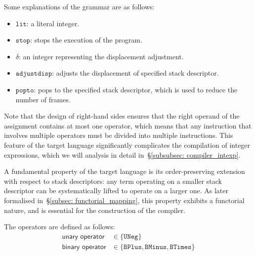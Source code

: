 \documentclass[12pt,a4paper]{report}
\theoremstyle{definition}
\newcommand{\secref}[1]{\S\ref{#1}}
\begin{document}
    Some explanations of the grammar are as follows:
    \begin{itemize}
        \item 
            $\texttt{lit}$: a literal integer.
        \item 
            $\texttt{stop}$: stops the execution of the program.
        \item 
            $\delta$: an integer representing the displacement adjustment.
        \item 
            $\texttt{adjustdisp}$: adjusts the displacement of specified stack descriptor.
        \item 
            $\texttt{popto}$: pops to the specified stack descriptor, which is used to reduce the number of frames.
    \end{itemize}
    Note that the design of right-hand sides ensures that the right operand of the assignment contains at most one operator, which means that any instruction that involves multiple operators must be divided into multiple instructions. This feature of the target language significantly complicates the compilation of integer expressions, which we will analysis in detail in~\secref{subsubsec: compiler_intexp}.

    A fundamental property of the target language is its order-preserving extension with respect to stack descriptors: any term operating on a smaller stack descriptor can be systematically lifted to operate on a larger one. As later formalised in~\secref{subsec: functorial_mapping}, this property exhibits a functorial nature, and is essential for the construction of the compiler.

    The operators are defined as follows:
    \[\begin{aligned}
        \textsf{unary operator} &\in \{\texttt{UNeg}\} \\
        \textsf{binary operator} &\in \{\texttt{BPlus}, \texttt{BMinus}, \texttt{BTimes}\} \\
    \end{aligned}\]
\end{document}
